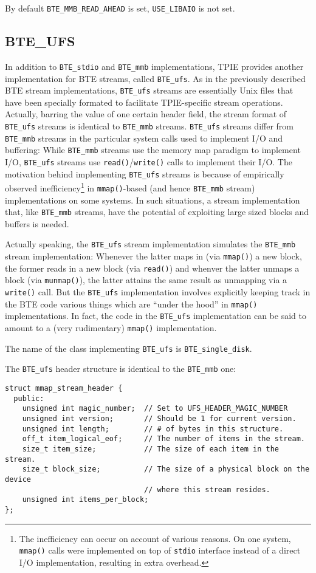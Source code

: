 By default \verb|BTE_MMB_READ_AHEAD| is set, \verb|USE_LIBAIO| is not set.


\subsection{BTE\_UFS}

In addition to \verb|BTE_stdio| and  \verb|BTE_mmb| implementations,
TPIE provides another implementation for BTE streams, called
\verb|BTE_ufs|. As in the previously described BTE stream
implementations, \verb|BTE_ufs| streams are essentially Unix files
that have been specially formated to facilitate TPIE-specific stream
operations. Actually, barring the value of one certain header field, the 
stream format of \verb|BTE_ufs| streams is identical to
\verb|BTE_mmb| streams. \verb|BTE_ufs| streams differ from 
\verb|BTE_mmb| streams in the particular system calls used to
implement I/O and buffering: While \verb|BTE_mmb| streams use the memory
map paradigm to implement I/O,  \verb|BTE_ufs| streams use 
\verb|read()|/\verb|write()| calls to implement their I/O. The
motivation behind implementing  \verb|BTE_ufs| streams is because of
empirically observed inefficiency\footnote{The inefficiency can occur
on account of various reasons. On one system,  \verb|mmap()| calls
were implemented on top of  \verb|stdio| interface instead of a direct
I/O implementation, resulting in extra overhead.} 
in \verb|mmap()|-based (and hence
\verb|BTE_mmb| stream) implementations on some systems. 
In such situations, a stream implementation that,
like  \verb|BTE_mmb| streams, have the potential of  
exploiting large sized blocks and buffers is needed.


Actually speaking, the \verb|BTE_ufs| stream implementation simulates
the \verb|BTE_mmb| stream implementation: Whenever the latter maps in
(via  \verb|mmap()|) a new block, the former reads in a new block (via
\verb|read()|) and whenver the latter unmaps a block (via
\verb|munmap()|), the latter attains the same result as unmapping via
a \verb|write()| call. But  the \verb|BTE_ufs| implementation involves
explicitly keeping track in the BTE code various things which are 
``under the hood'' in \verb|mmap()| implementations. In fact, the code
in the  \verb|BTE_ufs| implementation can be said to amount to a
(very rudimentary) \verb|mmap()| implementation.

The name of the class implementing  \verb|BTE_ufs| is \verb|BTE_single_disk|.

The \verb|BTE_ufs| header structure is identical to the \verb|BTE_mmb|
one:
\begin{verbatim}
struct mmap_stream_header { 
  public:
    unsigned int magic_number;  // Set to UFS_HEADER_MAGIC_NUMBER
    unsigned int version;       // Should be 1 for current version.
    unsigned int length;        // # of bytes in this structure.
    off_t item_logical_eof;     // The number of items in the stream.
    size_t item_size;           // The size of each item in the stream.
    size_t block_size;          // The size of a physical block on the device
                                // where this stream resides.
    unsigned int items_per_block;
};
\end{verbatim}

